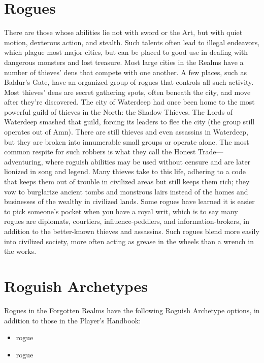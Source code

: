\documentclass[10pt,a4paper,twoside,twocolumn,openany,bg=print,nodeprecatedcode]{dndbook}
\begin{document}
\section{Rogues}
There are those whose abilities lie not with sword or the Art, but with quiet motion, dexterous action, and stealth. Such talents often lead to illegal endeavors, which plague most major cities, but can be placed to good use in dealing with dangerous monsters and lost treasure.
Most large cities in the Realms have a number of thieves' dens that compete with one another. A few places, such as Baldur's Gate, have an organized group of rogues that controls all such activity. Most thieves' dens are secret gathering spots, often beneath the city, and move after they're discovered.
The city of Waterdeep had once been home to the most powerful guild of thieves in the North: the Shadow Thieves. The Lords of Waterdeep smashed that guild, forcing its leaders to flee the city (the group still operates out of Amn). There are still thieves and even assassins in Waterdeep, but they are broken into innumerable small groups or operate alone.
The most common respite for such robbers is what they call the Honest Trade—adventuring, where roguish abilities may be used without censure and are later lionized in song and legend. Many thieves take to this life, adhering to a code that keeps them out of trouble in civilized areas but still keeps them rich; they vow to burglarize ancient tombs and monstrous lairs instead of the homes and businesses of the wealthy in civilized lands.
Some rogues have learned it is easier to pick someone's pocket when you have a royal writ, which is to say many rogues are diplomats, courtiers, influence-peddlers, and information-brokers, in addition to the better-known thieves and assassins. Such rogues blend more easily into civilized society, more often acting as grease in the wheels than a wrench in the works.
\section{Roguish Archetypes}
Rogues in the Forgotten Realms have the following Roguish Archetype options, in addition to those in the Player's Handbook:

\begin{itemize}
\item rogue
\item rogue
\end{itemize}
\end{document}
